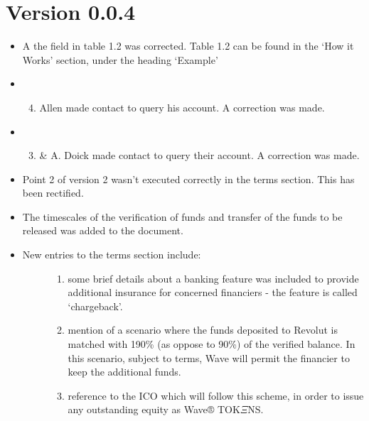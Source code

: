 \documentclass[letterpaper,10pt,openany,oneside,english]{sphinxmanual}
\begin{document}
\section{Version 0.0.4}
\label{\detokenize{releasenotes:version-0-0-4}}\begin{itemize}
\item {} 
A the field in table 1.2 was corrected. Table 1.2 can be found in the ‘How it Works’ section, under the heading ‘Example’

\item {} \begin{enumerate}
\setcounter{enumi}{3}
\item {} 
Allen made contact to query his account. A correction was made.

\end{enumerate}

\item {} \begin{enumerate}
\setcounter{enumi}{2}
\item {} 
\& A. Doick made contact to query their account. A correction was made.

\end{enumerate}

\item {} 
Point 2 of version 2 wasn’t executed correctly in the terms section. This has been rectified.

\item {} 
The timescales of the verification of funds and transfer of the funds to be released was added to the document.

\item {} \begin{description}
\item[{New entries to the terms section include:}] \leavevmode\begin{enumerate}
\item {} 
some brief details about a banking feature was included to provide additional insurance for concerned financiers - the feature is called ‘chargeback’.

\item {} 
mention of a scenario where the funds deposited to Revolut is matched with 190\% (as oppose to 90\%) of the verified balance. In this scenario, subject to terms, Wave will permit the financier to keep the additional funds.

\item {} 
reference to the ICO which will follow this scheme, in order to issue any outstanding equity as Wave® TOK\(\Xi\)NS.

\end{enumerate}

\end{description}

\end{itemize}
\end{document}
